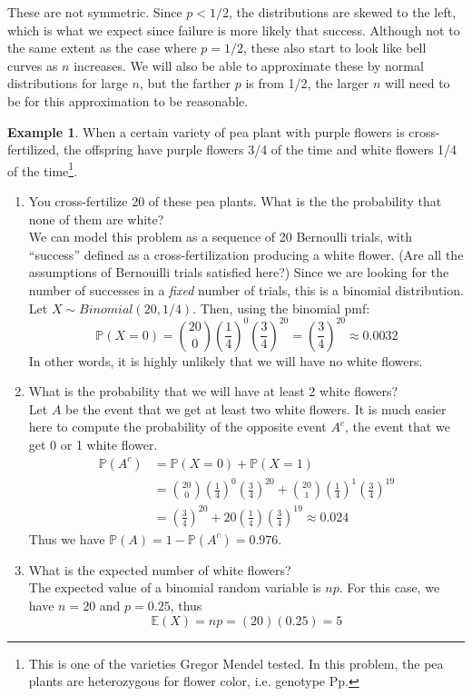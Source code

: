 \documentclass[12pt]{article}
\theoremstyle{definition}
\newtheorem*{example}{Example}
\theoremstyle{remark}
\def\P{{\mathbb P}}
\def\E{{\mathbb E}}
\begin{document}
These are not symmetric. Since $p < 1/2$, the distributions are skewed to the left, which is what we expect since failure is more likely that success. Although not to the same extent as the case where $p = 1/2$, these also start to look like bell curves as $n$ increases. We will also be able to approximate these by normal distributions for large $n$, but the farther $p$ is from 1/2, the larger $n$ will need to be for this approximation to be reasonable.

\begin{example}When a certain variety of pea plant with purple flowers is cross-fertilized, the offspring have purple flowers 3/4 of the time and white flowers 1/4 of the time\footnote{This is one of the varieties Gregor Mendel tested. In this problem, the pea plants are heterozygous for flower color, i.e. genotype Pp.}. 
\begin{enumerate}
\item You cross-fertilize 20 of these pea plants. What is the the probability that none of them are white?\\

We can model this problem as a sequence of 20 Bernoulli trials, with ``success'' defined as a cross-fertilization producing a white flower. (Are all the assumptions of Bernouilli trials satisfied here?) Since we are looking for the number of successes in a \emph{fixed} number of trials, this is a binomial distribution. Let $X \sim Binomial(20, 1/4)$. Then, using the binomial pmf:
\[
\P(X = 0) = \binom{20}{0}\left(\frac{1}{4}\right)^0 \left(\frac{3}{4}\right)^{20} = \left(\frac{3}{4}\right)^{20} \approx 0.0032
\]
In other words, it is highly unlikely that we will have no white flowers.

\item What is the probability that we will have at least 2 white flowers?\\

Let $A$ be the event that we get at least two white flowers. It is much easier here to compute the probability of the opposite event $A^c$, the event that we get 0 or 1 white flower. 
\begin{align*}
\P(A^c) &= \P(X = 0) + \P(X = 1) \\
&= \binom{20}{0}\left(\frac{1}{4}\right)^0 \left(\frac{3}{4}\right)^{20} + \binom{20}{1}\left(\frac{1}{4}\right)^1 \left(\frac{3}{4}\right)^{19} \\
&= \left(\frac{3}{4}\right)^{20} + 20 \left(\frac{1}{4}\right) \left(\frac{3}{4}\right)^{19} \approx 0.024
\end{align*}
Thus we have $\P(A) = 1 - \P(A^c) = 0.976$.

\item What is the expected number of white flowers? \\

The expected value of a binomial random variable is $np$. For this case, we have $n = 20$ and $p = 0.25$, thus
\[
\E(X) = n p = (20)(0.25) = 5
\]
\end{enumerate} 
\end{example}

\end{document}
